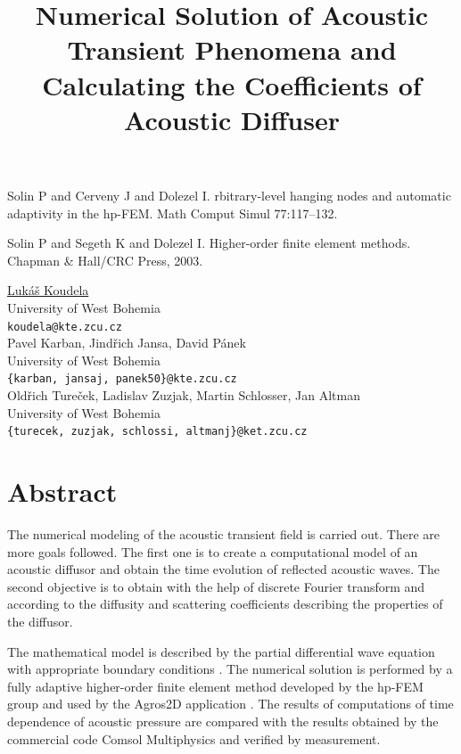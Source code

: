 \documentclass[article,A4,11pt]{llncs}%
\begin{document}

\begin{thebibliography}{10}
{\sc Solin P and Cerveny J and Dolezel I}. {rbitrary-level hanging nodes and automatic adaptivity in the hp-FEM}. Math Comput Simul 77:117–132.

{\sc Solin P and Segeth K and Dolezel I}. {Higher-order finite element methods}. Chapman \& Hall/CRC Press, 2003.
\end{thebibliography}

\title{Numerical Solution of Acoustic Transient Phenomena and Calculating the Coefficients of Acoustic Diffuser}
 \author{} \institute{}
\maketitle
\begin{center}
{\large \underline{Lukáš Koudela}}\\
University of West Bohemia\\
{\tt koudela@kte.zcu.cz}
\\ \vspace{4mm}
{\large Pavel Karban, Jindřich Jansa, David Pánek}\\
University of West Bohemia\\
{\tt \{karban, jansaj, panek50\}@kte.zcu.cz}
\\ \vspace{4mm}
{\large Oldřich Tureček, Ladislav Zuzjak, Martin Schlosser, Jan Altman}\\
University of West Bohemia\\
{\tt \{turecek, zuzjak, schlossi, altmanj\}@ket.zcu.cz}
\end{center}

\section*{Abstract}
The numerical modeling of the acoustic transient field is carried out. There are more goals followed. The first one is to create a computational model of an acoustic diffusor and obtain the time evolution of reflected acoustic waves. The second objective is to obtain with the help of discrete Fourier transform and according to \cite{Acoustic Absorbers and Diffusers} the diffusity and scattering coefficients describing the properties of the diffusor. 

The mathematical model is described by the partial differential wave equation with appropriate boundary conditions \cite{Modeling of Loudspeaker Using hp-Adaptive Methods}. The numerical solution is performed by a fully adaptive higher-order finite element method developed by the hp-FEM group \cite{Hermes - Higher-Order Modular Finite Element System} and used by the Agros2D application \cite{Agros2D - Multiplatform C++ Application for the Solution of PDEs} \cite{Numerical Solution of Coupled Problems Using Code Agros2D}. The results of computations of time dependence of acoustic pressure are compared with the results obtained by the commercial code Comsol Multiphysics \cite{Version 4.2} and verified by measurement. 
\end{document}
